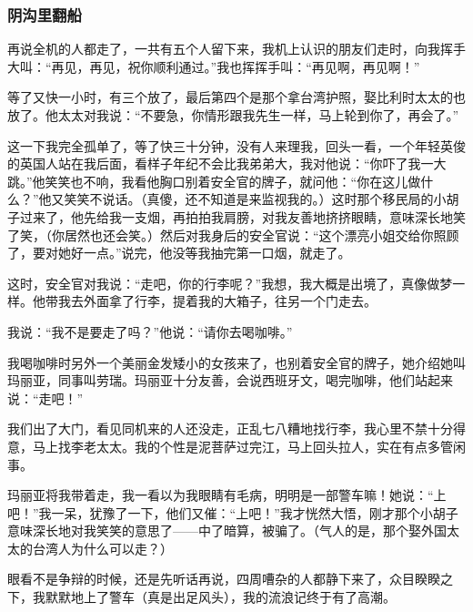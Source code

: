\subsubsection*{阴沟里翻船}
\par 再说全机的人都走了，一共有五个人留下来，我机上认识的朋友们走时，向我挥手大叫：“再见，再见，祝你顺利通过。”我也挥挥手叫：“再见啊，再见啊！”
\par 等了又快一小时，有三个放了，最后第四个是那个拿台湾护照，娶比利时太太的也放了。他太太对我说：“不要急，你情形跟我先生一样，马上轮到你了，再会了。”
\par 这一下我完全孤单了，等了快三十分钟，没有人来理我，回头一看，一个年轻英俊的英国人站在我后面，看样子年纪不会比我弟弟大，我对他说：“你吓了我一大跳。”他笑笑也不响，我看他胸口别着安全官的牌子，就问他：“你在这儿做什么？”他又笑笑不说话。（真傻，还不知道是来监视我的。）这时那个移民局的小胡子过来了，他先给我一支烟，再拍拍我肩膀，对我友善地挤挤眼睛，意味深长地笑了笑，（你居然也还会笑。）然后对我身后的安全官说：“这个漂亮小姐交给你照顾了，要对她好一点。”说完，他没等我抽完第一口烟，就走了。
\par 这时，安全官对我说：“走吧，你的行李呢？”我想，我大概是出境了，真像做梦一样。他带我去外面拿了行李，提着我的大箱子，往另一个门走去。
\par 我说：“我不是要走了吗？”他说：“请你去喝咖啡。”
\par 我喝咖啡时另外一个美丽金发矮小的女孩来了，也别着安全官的牌子，她介绍她叫玛丽亚，同事叫劳瑞。玛丽亚十分友善，会说西班牙文，喝完咖啡，他们站起来说：“走吧！”
\par 我们出了大门，看见同机来的人还没走，正乱七八糟地找行李，我心里不禁十分得意，马上找李老太太。我的个性是泥菩萨过完江，马上回头拉人，实在有点多管闲事。
\par 玛丽亚将我带着走，我一看以为我眼睛有毛病，明明是一部警车嘛！她说：“上吧！”我一呆，犹豫了一下，他们又催：“上吧！”我才恍然大悟，刚才那个小胡子意味深长地对我笑笑的意思了——中了暗算，被骗了。（气人的是，那个娶外国太太的台湾人为什么可以走？）
\par 眼看不是争辩的时候，还是先听话再说，四周嘈杂的人都静下来了，众目睽睽之下，我默默地上了警车（真是出足风头），我的流浪记终于有了高潮。
